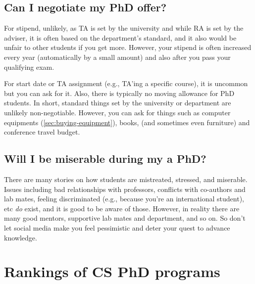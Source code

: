 \documentclass[oneside,11pt,dvipsnames]{book}
\begin{document}
\section{Can I negotiate my PhD offer?}\label{sec:negotiate}
For stipend, unlikely, as TA is set by the university and while RA is set by the adviser, it is often based on the department's standard, and it also would be unfair to other students if you get more. However, your stipend is often increased every year (automatically by a small amount) and also after you pass your qualifying exam.

For start date or TA assignment (e.g., TA'ing a specific course), it is uncommon but you can ask for it. Also, there is typically no moving allowance for PhD students. In short, standard things set by the university or department are unlikely non-negotiable.  However, you can ask for things such as computer equipments (\autoref{sec:buying-equipment}), books, (and sometimes even furniture) and conference travel budget.


\section{Will I be miserable during my a PhD?}\label{sec:happy}
There are many stories on how students are mistreated, stressed, and miserable. Issues including bad relationships with professors, conflicts with co-authors and lab mates, feeling discriminated (e.g., because you're an international student), etc \emph{do} exist, and it is good to be aware of those.  However, in reality there are many good mentors, supportive lab mates and department, and so on.  So don't let social media make you feel pessimistic and deter your quest to advance knowledge.

\appendix

\chapter{Rankings of CS PhD programs}\label{sec:ranking}
\end{document}
